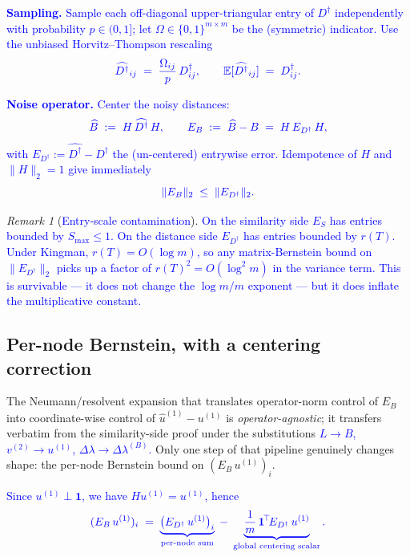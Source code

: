 \documentclass[11pt]{article}
\newcommand{\new}[1]{\textcolor{blue}{#1}}
\newcommand{\newmath}[1]{{\color{blue} #1}}
\theoremstyle{remark}
\newtheorem*{remark}{Remark}
\newcommand{\E}{\mathbb{E}}
\newcommand{\1}{\mathbf{1}}
\newcommand{\Ddist}{D^{\dagger}}      %
\newcommand{\hatD}{\widehat{\Ddist}}  %
\newcommand{\hatB}{\widehat{B}}
\newcommand{\hatu}{\widehat{u}}
\newcommand{\Bop}{B}
\newcommand{\Hop}{H}                  %
\newcommand{\rT}{r(T)}                %
\begin{document}
\new{\textbf{Sampling.}
Sample each off-diagonal upper-triangular entry of $\Ddist$ independently
with probability $p \in (0,1]$; let $\Omega \in \{0,1\}^{m\times m}$ be
the (symmetric) indicator. Use the unbiased Horvitz--Thompson rescaling}
\begin{equation}
\newmath{
  \hatD_{ij} \;=\; \frac{\Omega_{ij}}{p}\,\Ddist_{ij},
  \qquad
  \E[\hatD_{ij}] \;=\; \Ddist_{ij}.
}
\end{equation}

\new{\textbf{Noise operator.}
Center the noisy distances:}
\begin{equation}
\newmath{
  \hatB \;:=\; \Hop\,\hatD\,\Hop,
  \qquad
  E_{B} \;:=\; \hatB - \Bop \;=\; \Hop\,E_{\Ddist}\,\Hop,
}
\end{equation}
\new{with $E_{\Ddist} := \hatD - \Ddist$ the (un-centered) entrywise
error. Idempotence of $\Hop$ and $\|\Hop\|_{2} = 1$ give immediately}
\begin{equation}
\newmath{
  \|E_{B}\|_{2} \;\leq\; \|E_{\Ddist}\|_{2}.
}
\label{eq:EB-bound}
\end{equation}

\begin{remark}[\new{Entry-scale contamination}]
\new{On the similarity side $E_{S}$ has entries bounded by $S_{\max} \le
1$. On the distance side $E_{\Ddist}$ has entries bounded by $\rT$.
Under Kingman, $\rT = O(\log m)$, so any matrix-Bernstein bound on
$\|E_{\Ddist}\|_{2}$ picks up a factor of $\rT^{2} = O(\log^{2} m)$ in
the variance term. This is survivable --- it does not change the
$\log m / m$ exponent --- but it does inflate the multiplicative constant.}
\end{remark}

\subsection{Per-node Bernstein, with a centering correction}
\label{sec:per-node}

The Neumann/resolvent expansion that translates operator-norm control of
$E_{B}$ into coordinate-wise control of $\hatu^{(1)} - u^{(1)}$ is
\emph{operator-agnostic}; it transfers verbatim from the similarity-side
proof under the substitutions
\new{$L \to \Bop$, $v^{(2)} \to u^{(1)}$, $\Delta\lambda \to
\Delta\lambda^{(B)}$.}
Only one step of that pipeline genuinely changes shape: the per-node
Bernstein bound on $(E_{B}\,u^{(1)})_{i}$.

\new{Since $u^{(1)} \perp \1$, we have $\Hop u^{(1)} = u^{(1)}$, hence}
\begin{equation}
\newmath{
  (E_{B}\,u^{(1)})_{i}
  \;=\;
  \underbrace{\bigl(E_{\Ddist}\,u^{(1)}\bigr)_{i}}_{\text{per-node sum}}
  \;-\;
  \underbrace{\frac{1}{m}\,\1^{\!\top}\!E_{\Ddist}\,u^{(1)}}_{\text{global centering scalar}}.
}
\label{eq:M10-split}
\end{equation}
\end{document}
